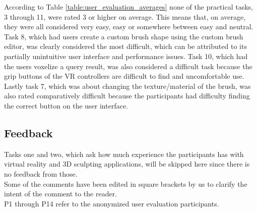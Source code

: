 According to Table \ref{table:user_evaluation_averages} none of the practical tasks, 3 through 11, were rated 3 or higher on average. This means that, on average, they were all considered very easy, easy or somewhere between easy and neutral. Task 8, which had users create a custom brush shape using the custom brush editor, was clearly considered the most difficult, which can be attributed to its partially unintuitive user interface and performance issues. Task 10, which had the users voxelize a query result, was also considered a difficult task because the grip buttons of the VR controllers are difficult to find and uncomfortable use. Lastly task 7, which was about changing the texture/material of the brush, was also rated comparatively difficult because the participants had difficulty finding the correct button on the user interface.

\subsection{Feedback}
\label{sec:feedback}

Tasks one and two, which ask how much experience the participants has with virtual reality and 3D sculpting applications, will be skipped here since there is no feedback from those.\\
Some of the comments have been edited in square brackets by us to clarify the intent of the comment to the reader.\\
P1 through P14 refer to the anonymized user evaluation participants.


